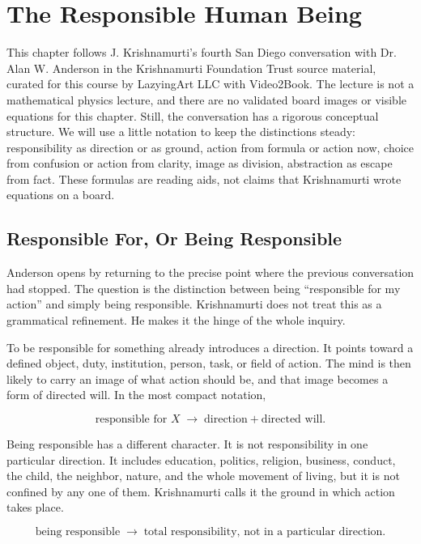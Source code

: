 \chapter{The Responsible Human Being}

This chapter follows J. Krishnamurti's fourth San Diego conversation with Dr. Alan W. Anderson in the Krishnamurti Foundation Trust source material, curated for this course by LazyingArt LLC with Video2Book. The lecture is not a mathematical physics lecture, and there are no validated board images or visible equations for this chapter. Still, the conversation has a rigorous conceptual structure. We will use a little notation to keep the distinctions steady: responsibility as direction or as ground, action from formula or action now, choice from confusion or action from clarity, image as division, abstraction as escape from fact. These formulas are reading aids, not claims that Krishnamurti wrote equations on a board.

\section{Responsible For, Or Being Responsible}

Anderson opens by returning to the precise point where the previous conversation had stopped. The question is the distinction between being ``responsible for my action'' and simply being responsible. Krishnamurti does not treat this as a grammatical refinement. He makes it the hinge of the whole inquiry.

To be responsible for something already introduces a direction. It points toward a defined object, duty, institution, person, task, or field of action. The mind is then likely to carry an image of what action should be, and that image becomes a form of directed will. In the most compact notation,

\begin{equation}
\text{responsible for } X
\;\longrightarrow\;
\text{direction}+\text{directed will}.
\end{equation}

Being responsible has a different character. It is not responsibility in one particular direction. It includes education, politics, religion, business, conduct, the child, the neighbor, nature, and the whole movement of living, but it is not confined by any one of them. Krishnamurti calls it the ground in which action takes place.

\begin{equation}
\text{being responsible}
\;\longrightarrow\;
\text{total responsibility, not in a particular direction}.
\end{equation}

